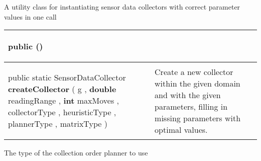  {\scriptsize A utility class for instantiating sensor data collectors with correct parameter values in one call
 
\vspace*{-5pt} 
\begin{tabularx}{\linewidth}{m{}|m{}}
\label{tab:SensorDataCollectorFactory}
\begin{raggedleft}public  \textbf{\hyperref[tab:SensorDataCollectorFactory]{\color{blue}{SensorDataCollectorFactory}}}()
\end{raggedleft} &
 \\ \hline 
\begin{raggedleft}public static SensorDataCollector \textbf{createCollector }(\newline \hfill 
\hspace*{ 5pt} \textbf{\hyperref[tab:ConstrainedTreeGraph]{\color{blue}{ConstrainedTreeGraph}}} g , \newline
 \hspace*{ 5pt} \textbf{double} readingRange , \newline
 \hspace*{ 5pt} \textbf{int} maxMoves , \newline
 \hspace*{ 5pt} \textbf{\hyperref[tab:SensorDataCollectorFactory.CollectorType]{\color{blue}{CollectorType}}} collectorType , \newline
 \hspace*{ 5pt} \textbf{\hyperref[tab:SensorDataCollectorFactory.PathfindingHeuristicType]{\color{blue}{PathfindingHeuristicType}}} heuristicType , \newline
 \hspace*{ 5pt} \textbf{\hyperref[tab:SensorDataCollectorFactory.CollectionOrderPlannerType]{\color{blue}{CollectionOrderPlannerType}}} plannerType , \newline
 \hspace*{ 5pt} \textbf{\hyperref[tab:SensorDataCollectorFactory.DistanceMatrixType]{\color{blue}{DistanceMatrixType}}} matrixType  )
\end{raggedleft} &
 Create a new collector within the given domain and with the given parameters, filling in missing parameters with optimal values.\\\end{tabularx}
}
 {\scriptsize The type of the collection order planner to use
 
\label{tab:SensorDataCollectorFactory.CollectionOrderPlannerType}
}
